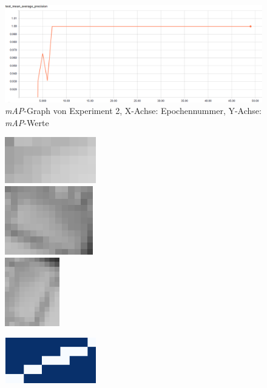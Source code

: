 \begin{figure}[ht]
	\centering
    \includegraphics[width=.7\textwidth]{pics/map-2.PNG}
    \caption{\textit{mAP}-Graph von Experiment 2, X-Achse: Epochennummer, Y-Achse: \textit{mAP}-Werte}
    \label{fig:map-2}
\end{figure}

\begin{figure}[ht]
  \centering
  \begin{minipage}[c]{.3\textwidth}
  \centering
  \includegraphics[height=2cm]{pics/roi-2-1.png}
  \\ \vspace{.5cm}
  \includegraphics[height=3cm]{pics/roi-2-2.png}
  \\ \vspace{.5cm}
  \includegraphics[height=3cm]{pics/roi-2-3.png}
  \end{minipage}
  \begin{minipage}[c]{.3\textwidth}
  \centering
  \includegraphics[height=2cm]{pics/mask-2-1.png}

\end{minipage}
\end{figure}
